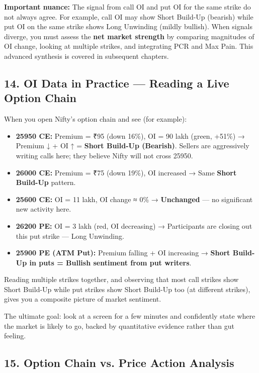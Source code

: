 \documentclass[12pt,openany]{book}
\begin{document}
\textbf{Important nuance:} The signal from call OI and put OI for the same strike do not always agree. For example, call OI may show Short Build-Up (bearish) while put OI on the same strike shows Long Unwinding (mildly bullish). When signals diverge, you must assess the \textbf{net market strength} by comparing magnitudes of OI change, looking at multiple strikes, and integrating PCR and Max Pain. This advanced synthesis is covered in subsequent chapters.

\subsection{14. OI Data in Practice — Reading a Live Option Chain}

When you open Nifty's option chain and see (for example):

\begin{itemize}[leftmargin=*]
    \item \textbf{25950 CE:} Premium = ₹95 (down 16\%), OI = 90 lakh (green, +51\%) → Premium ↓ + OI ↑ = \textbf{Short Build-Up (Bearish)}. Sellers are aggressively writing calls here; they believe Nifty will not cross 25950.
    \item \textbf{26000 CE:} Premium = ₹75 (down 19\%), OI increased → Same \textbf{Short Build-Up} pattern.
    \item \textbf{25600 CE:} OI = 11 lakh, OI change ≈ 0\% → \textbf{Unchanged} — no significant new activity here.
    \item \textbf{26200 PE:} OI = 3 lakh (red, OI decreasing) → Participants are closing out this put strike — Long Unwinding.
    \item \textbf{25900 PE (ATM Put):} Premium falling + OI increasing → \textbf{Short Build-Up in puts = Bullish sentiment from put writers}.
\end{itemize}

Reading multiple strikes together, and observing that most call strikes show Short Build-Up while put strikes show Short Build-Up too (at different strikes), gives you a composite picture of market sentiment.

The ultimate goal: look at a screen for a few minutes and confidently state where the market is likely to go, backed by quantitative evidence rather than gut feeling.


\subsection{15. Option Chain vs. Price Action Analysis}
\end{document}
